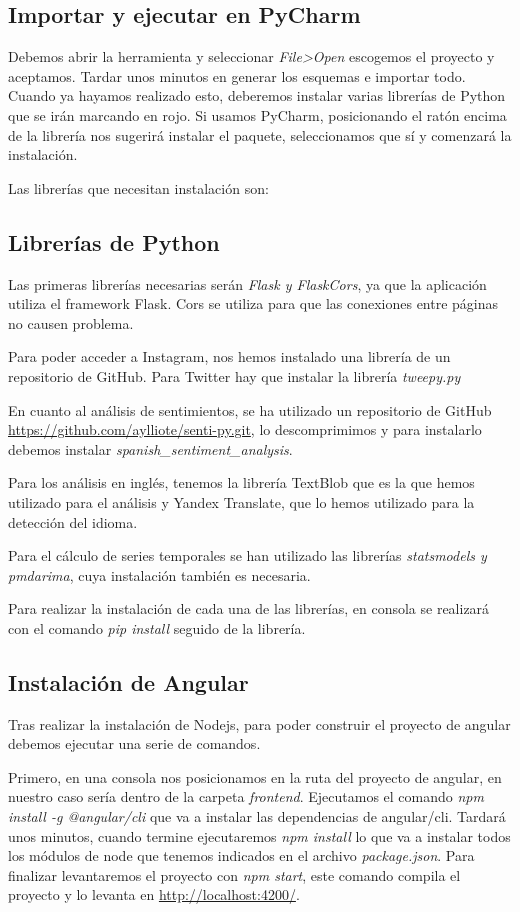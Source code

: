 \subsection{Importar y ejecutar en PyCharm}
Debemos abrir la herramienta y seleccionar \textit{File>Open} escogemos el proyecto y aceptamos.
Tardar unos minutos en generar los esquemas e importar todo. 
Cuando ya hayamos realizado esto, deberemos instalar varias librerías de Python que se irán marcando en rojo.
Si usamos PyCharm, posicionando el ratón encima de la librería nos sugerirá instalar el paquete, seleccionamos que sí y comenzará la instalación.

Las librerías que necesitan instalación son:

\subsection{Librerías de Python}
Las primeras librerías necesarias serán \textit{Flask y Flask\-Cors}, ya que la aplicación utiliza el framework Flask.
Cors se utiliza para que las conexiones entre páginas no causen problema.

Para poder acceder a Instagram, nos hemos instalado una librería de un repositorio de GitHub.
Para Twitter hay que instalar la librería \textit{tweepy.py}

En cuanto al análisis de sentimientos, se ha utilizado un repositorio de GitHub \url{https://github.com/aylliote/senti-py.git}, lo descomprimimos y para instalarlo debemos instalar \textit{spanish\_sentiment\_analysis}.

Para los análisis en inglés, tenemos la librería TextBlob que es la que hemos utilizado para el análisis y Yandex Translate, que lo hemos utilizado para la detección del idioma.

Para el cálculo de series temporales se han utilizado las librerías \textit{statsmodels y pmdarima}, cuya instalación también es necesaria.

Para realizar la instalación de cada una de las librerías, en consola se realizará con el comando \textit{pip install} seguido de la librería.


\subsection{Instalación de Angular}
Tras realizar la instalación de Nodejs, para poder construir el proyecto de angular debemos ejecutar una serie de comandos.

Primero, en una consola nos posicionamos en la ruta del proyecto de angular, en nuestro caso sería dentro de la carpeta \textit{frontend}.
Ejecutamos el comando \textit{npm install -g @angular/cli} que va a instalar las dependencias de angular/cli.
Tardará unos minutos, cuando termine ejecutaremos \textit{npm install} lo que va a instalar todos los módulos de node que tenemos indicados en el archivo \textit{package.json}.
Para finalizar levantaremos el proyecto con \textit{npm start}, este comando compila el proyecto y lo levanta en \url{http://localhost:4200/}.

